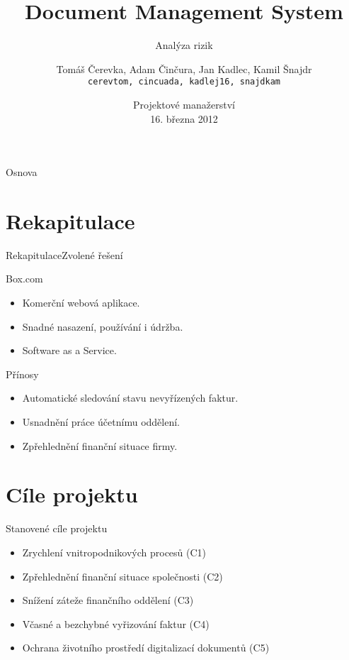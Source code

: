 \documentclass[10pt]{beamer}
\title[Document Management System]{Document Management System}
\subtitle{Analýza rizik}
\author[Adam Činčura] {
  Tomáš Čerevka, Adam Činčura, Jan Kadlec, Kamil Šnajdr \\
  {\tt cerevtom, cincuada, kadlej16, snajdkam}
}
\institute[ČVUT FIT] {
  Fakulta informačních technologií \\
  České vysoké učení technické \\
  Praha
}
\date[\today]{
Projektové manažerství \\
{\normalsize 16. března 2012}
}
\begin{document}
\begin{frame}[plain]
  \titlepage
\end{frame}

\begin{frame}{Osnova}{}
	\tableofcontents
\end{frame}

\section{Rekapitulace}

\begin{frame}{Rekapitulace}{Zvolené řešení}	
	\begin{block}{Box.com}
		\begin{itemize}
			\item Komerční webová aplikace.
			\item Snadné nasazení, používání i údržba.
			\item Software as a Service.	
		\end{itemize}
	\end{block}
	
	\begin{block}{Přínosy}
		\begin{itemize}
			\item Automatické sledování stavu nevyřízených faktur.
			\item Usnadnění práce účetnímu oddělení.
			\item Zpřehlednění finanční situace firmy.
		\end{itemize}
	\end{block}
\end{frame}

\section{Cíle projektu}
\begin {frame}{Stanovené cíle projektu}
\begin {itemize}
\item Zrychlení vnitropodnikových procesů (C1)
\item Zpřehlednění finanční situace společnosti (C2)
\item Snížení záteže finančního oddělení (C3)
\item Včasné a bezchybné vyřizování faktur (C4)
\item Ochrana životního prostředí digitalizací dokumentů (C5)
\end{itemize}
\end{frame}
\end{document}
